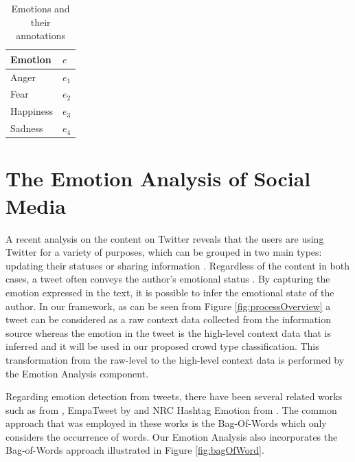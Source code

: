 \begin{table}
\caption{Emotions and their annotations}
\label{table:emotionAnnotation}
\centering
\begin{tabular}{|l|l|}
\hline
\textbf{Emotion} & \textbf{\(e\)} \\ \hline \hline
Anger & \(e_1\) \\ \hline
Fear & \(e_2\) \\ \hline
Happiness & \(e_3\) \\ \hline
Sadness & \(e_4\) \\ \hline
\end{tabular}
\end{table}

\section{The Emotion Analysis of Social Media}

A recent analysis on the content on Twitter reveals that the users are using Twitter for a variety of purposes, which can be grouped in two main types: updating their statuses or sharing information \citep{java2007we}. Regardless of the content in both cases, a tweet often conveys the author's emotional status \citep{bollen2009modeling}. By capturing the emotion expressed in the text, it is possible to infer the emotional state of the author. In our framework, as can be seen from Figure \ref{fig:processOverview} a tweet can be considered as a raw context data collected from the information source whereas the emotion in the tweet is the high-level context data that is inferred and it will be used in our proposed crowd type classification. This transformation from the raw-level to the high-level context data is performed by the Emotion Analysis component. 

Regarding emotion detection from tweets, there have been several related works such as from \citet{bollen2009modeling}, EmpaTweet by \citet{roberts2012empatweet} and NRC Hashtag Emotion from \citet{mohammad2014using}. The common approach that was employed in these works is the Bag-Of-Words which only considers the occurrence of words. Our Emotion Analysis also incorporates the Bag-of-Words approach illustrated in Figure \ref{fig:bagOfWord}.

